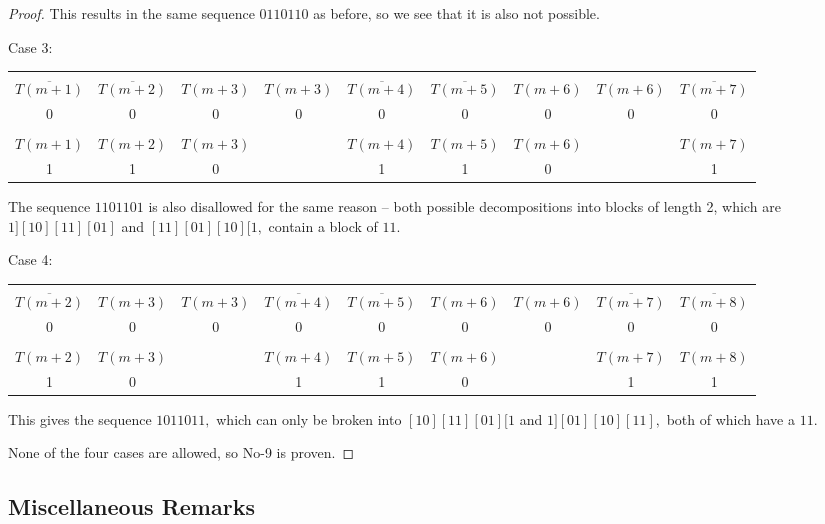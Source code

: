 \documentclass{article}
\begin{document}
\begin{proof}
This results in the same sequence $0110110$ as before, so we see that it is also not possible.

Case 3:

\begin{center}
\begin{tabular}{ |c|c|c|c|c|c|c|c|c| } 
 \hline
&&&&&&&&\\
$\overline{T(m+1)}$ & $\overline{T(m+2)}$ & $T(m+3)$ & $T(m+3)$ & $\overline{T(m+4)}$ & $\overline{T(m+5)}$ & $T(m+6)$ & $T(m+6)$ & $\overline{T(m+7)}$ \\ 
0 & 0 & 0 & 0 & 0 & 0 & 0 & 0 & 0 \\
\hline
&&&&&&&&\\
$T(m+1)$ & $T(m+2)$ & $T(m+3)$ & & $T(m+4)$ & $T(m+5)$ & $T(m+6)$ & & $T(m+7)$ \\
1 & 1 & 0 & & 1 & 1 & 0 & & 1 \\
 \hline
\end{tabular}
\end{center}

The sequence $1101101$ is also disallowed for the same reason -- both possible decompositions into blocks of length 2, which are $1][10][11][01]$ and $[11][01][10][1,$ contain a block of $11.$

Case 4:

\begin{center}
\begin{tabular}{ |c|c|c|c|c|c|c|c|c| } 
 \hline
&&&&&&&&\\
 $\overline{T(m+2)}$ & $T(m+3)$ & $T(m+3)$ & $\overline{T(m+4)}$ & $\overline{T(m+5)}$ & $T(m+6)$ & $T(m+6)$ & $\overline{T(m+7)}$ & $\overline{T(m+8)}$ \\ 
0 & 0 & 0 & 0 & 0 & 0 & 0 & 0 & 0 \\
\hline
&&&&&&&&\\
$T(m+2)$ & $T(m+3)$ & & $T(m+4)$ & $T(m+5)$ & $T(m+6)$ & & $T(m+7)$ & $T(m+8)$ \\
1 & 0 & & 1 & 1 & 0 & & 1 & 1 \\
 \hline
\end{tabular}
\end{center}

This gives the sequence $1011011,$ which can only be broken into $[10][11][01][1$ and $1][01][10][11],$ both of which have a $11.$

None of the four cases are allowed, so No-9 is proven.
\end{proof}

\subsection{Miscellaneous Remarks}
\end{document}
